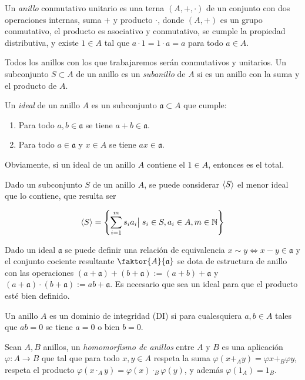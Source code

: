 \documentclass[./main.tex]{subfiles}
\begin{document}
\begin{definition} Un \emph{anillo} conmutativo unitario es una terna $(A,+,\cdot)$ de un conjunto con dos operaciones internas, suma $+$ y producto $\cdot$, donde $(A,+)$ es un grupo conmutativo, el producto es asociativo y conmutativo, se cumple la propiedad distributiva, y existe $1\in  A$ tal que $a\cdot 1 = 1\cdot a = a$ para todo $a\in A$.
\end{definition}

Todos los anillos con los que trabajaremos serán conmutativos y unitarios. Un subconjunto $S\subset A$ de un anillo es un \emph{subanillo} de $A$ si es un anillo con la suma y el producto de $A$.

\begin{definition}
Un \emph{ideal} de un anillo $A$ es un subconjunto $\mathfrak{a}\subset A$ que cumple:
\begin{enumerate}
  \item Para todo $a,b \in \mathfrak a$ se tiene $a+b\in \mathfrak a$.
  \item Para todo $a\in \mathfrak a$ y $x \in  A$ se tiene $ax \in \mathfrak a$.
\end{enumerate}
\end{definition}

Obviamente, si un ideal de un anillo $A$ contiene el $1\in A$, entonces es el total.

Dado un subconjunto $S$ de un anillo $A$, se puede considerar $\langle S \rangle$ el menor ideal que lo contiene, que resulta ser

\[ \langle S \rangle = \left \{  \sum_{i=1}^{m} s_i  a_i \big \vert \; s_i \in S, a_i \in A, m \in \mathbb N  \right \} \]

Dado un ideal $\mathfrak{a}$ se puede definir una relación de equivalencia $x\sim y \iff x-y \in \mathfrak a$ y el conjunto cociente resultante $\faktor{A}{\mathfrak a}$ se dota de estructura de anillo con las operaciones $(a+\mathfrak a) + (b+\mathfrak a) := (a+b)+\mathfrak a$ y $(a+\mathfrak a) \cdot (b+\mathfrak a) := ab + \mathfrak a$. Es necesario que sea un ideal para que el producto esté bien definido.

\begin{definition} Un anillo $A$ es un dominio de integridad (DI) si para cualesquiera $a,b\in A$ tales que $ab = 0$ se tiene $a = 0$ o bien $b=0$.
\end{definition}

\begin{definition} Sean $A,B$ anillos, un \emph{homomorfismo de anillos} entre $A$ y $B$ es una aplicación $\varphi:A\to B$ que tal que para todo $x,y\in A$ respeta la suma $\varphi(x+_Ay) = \varphi{x} +_B  \varphi{y}$, respeta el producto $\varphi(x\cdot_Ay) =  \varphi(x)\cdot_B\varphi(y)$, y además $\varphi(1_A) = 1_B$.
\end{definition}
\end{document}
